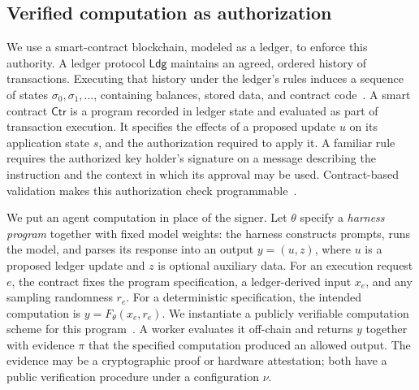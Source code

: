 \documentclass[10pt,letterpaper]{article}
\newcommand{\Ldg}{\mathsf{Ldg}}
\newcommand{\Ctr}{\mathsf{Ctr}}
\begin{document}
\subsection{Verified computation as authorization}
We use a smart-contract blockchain, modeled as a ledger, to enforce this authority. A ledger protocol $\Ldg$ maintains an agreed, ordered history of transactions. Executing that history under the ledger's rules induces a sequence of states $\sigma_0,\sigma_1,\ldots$, containing balances, stored data, and contract code~\citep{yellowpaper}. A smart contract $\Ctr$ is a program recorded in ledger state and evaluated as part of transaction execution. It specifies the effects of a proposed update $u$ on its application state $s$, and the authorization required to apply it. A familiar rule requires the authorized key holder's signature on a message describing the instruction and the context in which its approval may be used. Contract-based validation makes this authorization check programmable~\citep{erc1271}.

We put an agent computation in place of the signer. Let $\theta$ specify a \emph{harness program} together with fixed model weights: the harness constructs prompts, runs the model, and parses its response into an output $y=(u,z)$, where $u$ is a proposed ledger update and $z$ is optional auxiliary data. For an execution request $e$, the contract fixes the program specification, a ledger-derived input $x_e$, and any sampling randomness $r_e$. For a deterministic specification, the intended computation is $y=F_\theta(x_e,r_e)$. We instantiate a publicly verifiable computation scheme for this program~\citep{gennaro2010,pinocchio2013}. A worker evaluates it off-chain and returns $y$ together with evidence $\pi$ that the specified computation produced an allowed output. The evidence may be a cryptographic proof or hardware attestation; both have a public verification procedure under a configuration $\nu$.
\end{document}
